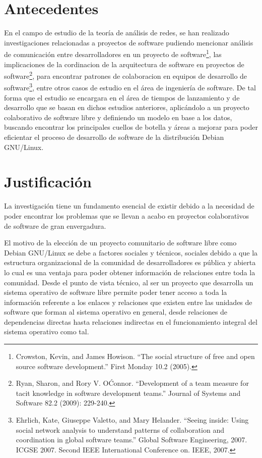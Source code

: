 \documentclass[12pt]{report}
\begin{document}
\chapter*{Antecedentes}  En  el  campo  de estudio  de  la  teoría  de
análisis  de redes,  se han  realizado investigaciones  relacionadas a
proyectos  de software  pudiendo  mencionar  análisis de  comunicación
entre  desarrolladores en  un proyecto  de software\footnote{Crowston,
Kevin, and  James Howison.   ``The social structure  of free  and open
source  software  development.''   First  Monday  10.2  (2005).},  las
implicaciones  de la  cordinacion de  la arquitectura  de software  en
proyectos    de     software\footnote{Ryan,    Sharon,     and    Rory
V. O\'Connor. ``Development  of a team measure for  tacit knowledge in
software  development teams.''  Journal of  Systems and  Software 82.2
(2009): 229-240.}, para encontrar  patrones de colaboracion en equipos
de  desarrollo de  software\footnote{Ehrlich, Kate,  Giuseppe Valetto,
and Mary Helander.  ``Seeing inside: Using social  network analysis to
understand  patterns  of  collaboration  and  coordination  in  global
software   teams.''   Global   Software   Engineering,   2007.   ICGSE
2007.  Second IEEE  International Conference  on. IEEE,  2007.}, entre
otros casos  de estudio en el  área de ingeniería de  software. De tal
forma que el estudio se encargara en el área de tiempos de lanzamiento
y  de  desarrollo   que  se  basan  en   dichos  estudios  anteriores,
aplicándolo a un proyecto colaborativo  de software libre y definiendo
un  modelo en  base a  los datos,  buscando encontrar  los principales
cuellos de botella y áreas a  mejorar para poder eficientar el proceso
de desarrollo de software de la distribución Debian GNU/Linux.

\chapter*{Justificación} La investigación tiene un fundamento esencial
de existir debido a la necesidad  de poder encontrar los problemas que
se  llevan a  acabo en  proyectos  colaborativos de  software de  gran
envergadura.

El motivo de la elección de  un proyecto comunitario de software libre
como Debian GNU/Linux se debe a factores sociales y técnicos, sociales
debido  a  que  la  estructura   organizacional  de  la  comunidad  de
desarrolladores es pública y abierta lo cual es una ventaja para poder
obtener información  de relaciones entre  toda la comunidad.  Desde el
punto de vista  técnico, al ser un proyecto que  desarrolla un sistema
operativo  de software  libre permite  poder  tener acceso  a toda  la
información referente a los enlaces y relaciones que existen entre las
unidades de software que forman al sistema operativo en general, desde
relaciones de dependencias directas  hasta relaciones indirectas en el
funcionamiento integral del sistema operativo como tal.
\end{document}
